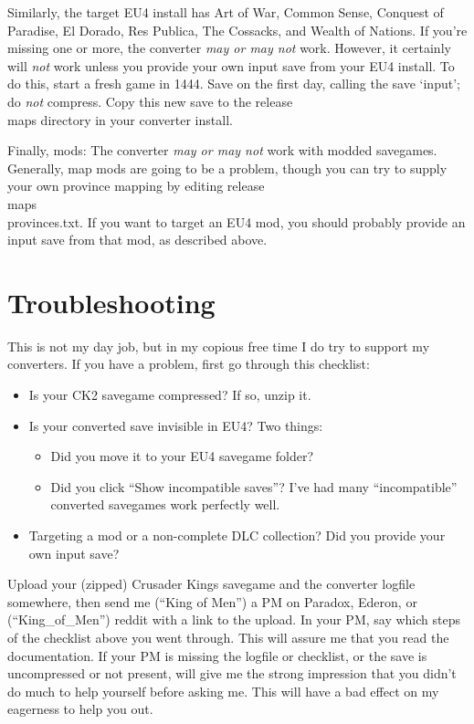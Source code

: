 \documentclass[12pt,ebook,oneside]{book}
\begin{document}
Similarly, the target EU4 install has Art of War, Common Sense,
Conquest of Paradise, El Dorado, Res Publica, The Cossacks, and Wealth
of Nations. If you're missing one or more, the converter \emph{may or
  may not} work. However, it certainly will \emph{not} work unless you
provide your own input save from your EU4 install. To do this, start a
fresh game in 1444. Save on the first day, calling the save `input';
do \emph{not} compress. Copy this new save to the release\\maps
directory in your converter install.

Finally, mods: The converter \emph{may or may not} work with modded
savegames. Generally, map mods are going to be a problem, though you
can try to supply your own province mapping by editing
release\\maps\\provinces.txt. If you want to target an EU4 mod, you
should probably provide an input save from that mod, as described
above.

\section{Troubleshooting}

This is not my day job, but in my copious free time I do try to
support my converters. If you have a problem, first go through this
checklist:

\begin{itemize}
\item Is your CK2 savegame compressed? If so, unzip it.
\item Is your converted save invisible in EU4? Two things:
\begin{itemize}
\item Did you move it to your EU4 savegame folder?
\item Did you click ``Show incompatible saves''? I've had many
  ``incompatible'' converted savegames work perfectly well.
\end{itemize}
\item Targeting a mod or a non-complete DLC collection? Did you
  provide your own input save?
\end{itemize}

Upload your (zipped) Crusader Kings
savegame and the converter logfile somewhere, then send me (``King of Men'') a PM on Paradox,
Ederon, or (``King\_of\_Men'') reddit with a link to the upload. In
your PM, say which steps of the checklist above you went through. This
will assure me that you read the documentation. If your PM is missing the
logfile or checklist, or the save is uncompressed or not present, will give
me the strong impression that you didn't do much to help yourself
before asking me. This will have a bad effect on my eagerness to help
you out.
\end{document}

